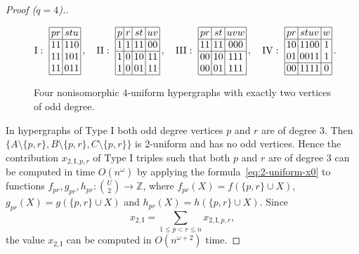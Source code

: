 \documentclass{amsart}
\begin{document}
\begin{proof}[Proof ($q=4$).]
\begin{figure}[t]
\[
\mathrm{I}:\ 
\begin{array}{|@{\,}c@{\,}|@{\,}c@{\,}|}
\hline
pr&stu\\\hline
11&110\\
11&101\\
11&011\\
\hline
\end{array}\,,
\quad
\mathrm{II}:\ 
\begin{array}{|@{\,}c@{\,}|@{\,}c@{\,}|@{\,}c@{\,}|@{\,}c@{\,}|}
\hline
p&r&st&uv\\\hline
1&1&11&00\\\hline
1&0&10&11\\
1&0&01&11\\
\hline
\end{array}\,,
\quad
\mathrm{III}:\ 
\begin{array}{|@{\,}c@{\,}|@{\,}c@{\,}|@{\,}c@{\,}|}
\hline
pr&st&uvw\\\hline
11&11&000\\\hline
00&10&111\\
00&01&111\\
\hline
\end{array}\,,
\quad
\mathrm{IV}:\ 
\begin{array}{|@{\,}c@{\,}|@{\,}c@{\,}|@{\,}c@{\,}|}
\hline
pr&stuv&w\\\hline
10&1100&1\\
01&0011&1\\\hline
00&1111&0\\
\hline
\end{array}\,.
\]
\caption{\label{fig:4-uniform-j=2}Four nonisomorphic $4$-uniform hypergraphs with exactly two vertices of odd degree.}
\end{figure}


In hypergraphs of Type I both odd degree vertices $p$ and $r$ are of degree 3.
Then $\{A\setminus\{p,r\},B\setminus\{p,r\},C\setminus\{p,r\}\}$ is 2-uniform and has no odd vertices.
Hence the contribution $x_{2,\mathrm{I},p,r}$ of Type I triples such that both $p$ and $r$ are of degree $3$ can be computed in time $O(n^{\omega})$ by applying the formula~\eqref{eq:2-uniform-x0} to functions $f_{pr},g_{pr},h_{pr}:{U\choose 2}\rightarrow \mathbb{Z}$, where $f_{pr}(X)=f(\{p,r\}\cup X)$, $g_{pr}(X)=g(\{p,r\}\cup X)$ and $h_{pr}(X)=h(\{p,r\}\cup X)$. 
Since \[x_{2,\mathrm{I}} = \sum_{1\le p<r\le n} x_{2,\mathrm{I},p,r},\]
the value $x_{2,\mathrm{I}}$ can be computed in $O(n^{\omega+2})$ time.


\end{proof}
\end{document}
